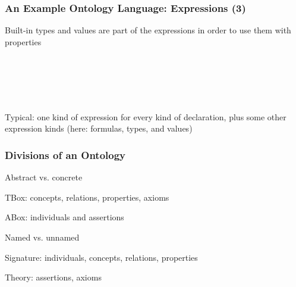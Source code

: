 \begin{frame}\frametitle{An Example Ontology Language: Expressions (3)}
Built-in types and values are part of the expressions in order to use them with properties
\begin{commgrammar}
\\
\\
\\
\\
\end{commgrammar}

Typical: one kind of expression for every kind of declaration, plus some other expression kinds (here: formulas, types, and values)
\end{frame}

\begin{frame}\frametitle{Divisions of an Ontology}
\begin{blockitems}{Abstract vs. concrete}
 \item TBox: concepts, relations, properties, axioms
 \item ABox: individuals and assertions
\end{blockitems}

\begin{blockitems}{Named vs. unnamed}
 \item Signature: individuals, concepts, relations, properties 
 \item Theory: assertions, axioms
\end{blockitems}
\end{frame}

